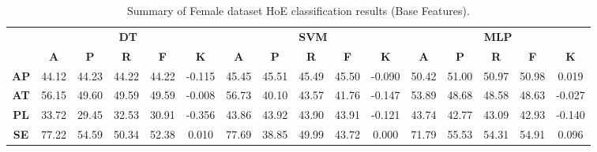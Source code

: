 \begin{landscape}
\begin{table}[htbp]
\footnotesize
\centering
\caption{Summary of Female dataset HoE classification results (Base Features).}
\label{tab:base_hoe_female}
\begin{tabular}{|c|c|c|c|c|c|c|c|c|c|c|c|c|c|c|c|}
\hline
\multirow{2}{*}{}	& \multicolumn{5}{c|}{\textbf{DT}}												& \multicolumn{5}{c|}{\textbf{SVM}}												& \multicolumn{5}{c|}{\textbf{MLP}}												\\ \cline{2-16} 
					& \textbf{A}	& \textbf{P}	& \textbf{R}	& \textbf{F}	& \textbf{K}	& \textbf{A}	& \textbf{P}	& \textbf{R}	& \textbf{F}	& \textbf{K}	& \textbf{A}	& \textbf{P}	& \textbf{R}	& \textbf{F}	& \textbf{K}	\\ \hline
\textbf{AP}			& 44.12			& 44.23			& 44.22			& 44.22			& -0.115			& 45.45			& 45.51			& 45.49			& 45.50			& -0.090			& 50.42			& 51.00			& 50.97			& 50.98			& 0.019			\\ \hline
\textbf{AT}			& 56.15			& 49.60			& 49.59			& 49.59			& -0.008			& 56.73			& 40.10			& 43.57			& 41.76			& -0.147			& 53.89			& 48.68			& 48.58			& 48.63			& -0.027			\\ \hline
\textbf{PL}			& 33.72			& 29.45			& 32.53			& 30.91			& -0.356			& 43.86			& 43.92			& 43.90			& 43.91			& -0.121			& 43.74			& 42.77			& 43.09			& 42.93			& -0.140			\\ \hline
\textbf{SE}			& 77.22			& 54.59			& 50.34			& 52.38			& 0.010			& 77.69			& 38.85			& 49.99			& 43.72			& 0.000			& 71.79			& 55.53			& 54.31			& 54.91			& 0.096			\\ \hline
\end{tabular}
\end{table}
\end{landscape}